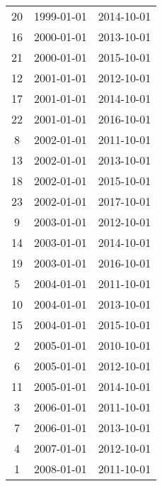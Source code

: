 % 
\begin{tabular}{ccc}
  \hline
  \hline
20 & 1999-01-01 & 2014-10-01 \\ 
  16 & 2000-01-01 & 2013-10-01 \\ 
  21 & 2000-01-01 & 2015-10-01 \\ 
  12 & 2001-01-01 & 2012-10-01 \\ 
  17 & 2001-01-01 & 2014-10-01 \\ 
  22 & 2001-01-01 & 2016-10-01 \\ 
  8 & 2002-01-01 & 2011-10-01 \\ 
  13 & 2002-01-01 & 2013-10-01 \\ 
  18 & 2002-01-01 & 2015-10-01 \\ 
  23 & 2002-01-01 & 2017-10-01 \\ 
  9 & 2003-01-01 & 2012-10-01 \\ 
  14 & 2003-01-01 & 2014-10-01 \\ 
  19 & 2003-01-01 & 2016-10-01 \\ 
  5 & 2004-01-01 & 2011-10-01 \\ 
  10 & 2004-01-01 & 2013-10-01 \\ 
  15 & 2004-01-01 & 2015-10-01 \\ 
  2 & 2005-01-01 & 2010-10-01 \\ 
  6 & 2005-01-01 & 2012-10-01 \\ 
  11 & 2005-01-01 & 2014-10-01 \\ 
  3 & 2006-01-01 & 2011-10-01 \\ 
  7 & 2006-01-01 & 2013-10-01 \\ 
  4 & 2007-01-01 & 2012-10-01 \\ 
  1 & 2008-01-01 & 2011-10-01 \\ 
   \hline
\end{tabular}
